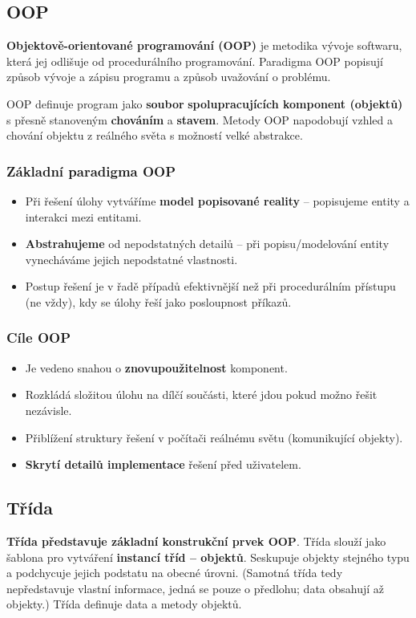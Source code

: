 \subsection{OOP}
\textbf{Objektově-orientované programování (OOP)} je metodika vývoje softwaru, která jej odlišuje od procedurálního programování. Paradigma OOP popisují způsob vývoje a zápisu programu a způsob uvažování o problému. 

OOP definuje program jako \textbf{soubor} \textbf{spolupracujících komponent (objektů)} s přesně stanoveným \textbf{chováním} a \textbf{stavem}. Metody OOP napodobují vzhled a chování objektu z reálného světa s možností velké abstrakce.

\subsubsection{Základní paradigma OOP}
\begin{itemize}
\item Při řešení úlohy vytváříme \textbf{model popisované reality} -- popisujeme entity a interakci mezi entitami.
\item \textbf{Abstrahujeme} od nepodstatných detailů -- při popisu/modelování entity vynecháváme jejich nepodstatné vlastnosti.
\item Postup řešení je v řadě případů efektivnější než při procedurálním přístupu (ne vždy), kdy se úlohy řeší jako posloupnost příkazů.
\end{itemize}

\subsubsection{Cíle OOP}
\begin{itemize}
\item Je vedeno snahou o \textbf{znovupoužitelnost} komponent.
\item Rozkládá složitou úlohu na dílčí součásti, které jdou pokud možno řešit nezávisle.
\item Přiblížení struktury řešení v počítači reálnému světu (komunikující objekty).
\item \textbf{Skrytí detailů implementace} řešení před uživatelem.
\end{itemize}

\subsection{Třída}
\textbf{Třída představuje základní konstrukční prvek OOP}. Třída slouží jako šablona pro vytváření \textbf{instancí tříd -- objektů}. Seskupuje objekty stejného typu a podchycuje jejich podstatu na obecné úrovni.  (Samotná třída tedy nepředstavuje vlastní informace, jedná se pouze o předlohu; data obsahují až objekty.) Třída definuje data a metody objektů. \textbf{}

